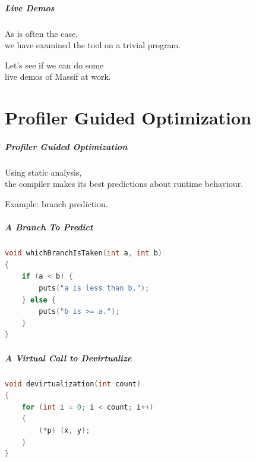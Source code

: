 \begin{frame}
\frametitle{Live Demos}

\large
\begin{changemargin}{2cm}
As is often the case, \\ we have examined the tool on a trivial program. 

Let's see if we can do some\\
 live demos of Massif at work.
\end{changemargin}
\end{frame}

\part{Profiler Guided Optimization}
\begin{frame}
\partpage
\end{frame}

\begin{frame}
\frametitle{Profiler Guided Optimization}

\Large
\begin{changemargin}{2cm}

Using static analysis, \\
the compiler makes its best predictions about runtime behaviour.

Example: branch prediction. 
\end{changemargin}

\end{frame}



\begin{frame}[fragile]
\frametitle{A Branch To Predict}
\begin{changemargin}{1.5cm}
\begin{lstlisting}[language=C,basicstyle=\large]
void whichBranchIsTaken(int a, int b)
{
    if (a < b) {
        puts("a is less than b.");
    } else {
        puts("b is >= a.");
    }
}
\end{lstlisting}
\end{changemargin}
\end{frame}

\begin{frame}[fragile]
\frametitle{A Virtual Call to Devirtualize}

\begin{changemargin}{2cm}
\begin{lstlisting}[language=C,basicstyle=\large]
void devirtualization(int count)
{
    for (int i = 0; i < count; i++)
    {
        (*p) (x, y);
    }
}
\end{lstlisting}
\end{changemargin}
\end{frame}

